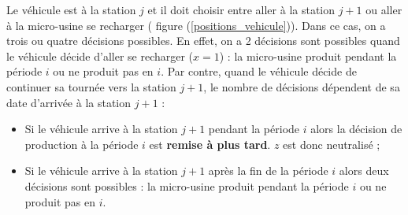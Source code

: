 Le véhicule est à la station $j$ et il doit choisir entre aller à la station $j+1$ ou aller à la micro-usine se recharger ( figure (\ref{positions_vehicule})). Dans ce cas, on a trois ou quatre décisions possibles. En effet, on a 2 décisions sont possibles quand le véhicule décide d'aller se recharger ($x=1$) : la micro-usine produit pendant la période $i$ ou ne produit pas en $i$. Par contre, quand le véhicule décide de continuer sa tournée vers la station $j+1$, le nombre de décisions dépendent de sa date d'arrivée à la station $j+1$ : 
\begin{itemize}[label=$\square$]
	\item Si le véhicule arrive à la station $j+1$ pendant la période $i$ alors la décision de production à la période $i$ est \textbf{remise à plus tard}. $z$ est donc neutralisé ;
	\item Si le véhicule arrive à la station $j+1$ après la fin de la période $i$ alors deux décisions sont possibles : la micro-usine produit pendant la période $i$ ou ne produit pas en $i$.
\end{itemize}
